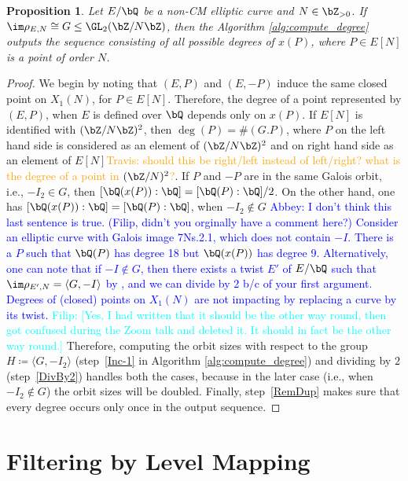 \documentclass[11pt,reqno]{amsart}
\theoremstyle{plain}
\newtheorem{proposition}[theorem]{Proposition}
\theoremstyle{definition}
\newcommand{\Q}{\bQ}
\newcommand{\Z}{\bZ}
\newcommand{\filip}[1]{{\textcolor{cyan}{Filip: [#1]}}}
\newcommand{\abbey}[1]{\textcolor{blue}{Abbey: #1}}
\newcommand{\travis}[1]{\textcolor{orange}{Travis: #1}}
\newcommand{\abedit}[1]{{\color{blue} #1}}
\begin{document}
\begin{proposition}
Let $E/\Q$ be a non-CM elliptic curve and $N \in \Z_{>0}$. If $\im \rho_{E,N} \cong G \leq \GL_2(\Z/N\Z)$, then the Algorithm \ref{alg:compute_degree} outputs the sequence consisting of all possible degrees of $x(P)$, where $P\in E[N]$ is a point of order $N$.
\end{proposition}
\begin{proof}
    We begin by noting that $(E, P)$ and $(E, -P)$ \abedit{induce the same closed} point on $X_1(N)$, for $P \in E[N]$. Therefore, the degree of
    a point represented by $(E, P)$, when
    $E$ is defined over $\Q$ depends only on $x(P)$.
    If $E[N]$ is identified with $(\Z/N\Z)^2$, then $\deg(P)=\# (G. P)$, where $P$ on the left hand side is considered as an element of $(\Z/N\Z)^2$
    and on right hand side as an element of $E[N]$\travis{should this be right/left instead of left/right? what is the degree of a point in $(\Z/N)^2$?}.
    If $P$ and $-P$ are in the same Galois orbit, i.e., $-I_2\in G$, then $[\Q(x(P)):\Q]=[\Q(P):\Q]/2$. On the other hand, one has $[\Q(x(P)):\Q]=[\Q(P):\Q]$, when
    $-I_2\notin G$ \abbey{I don't think this last sentence is true. (Filip, didn't you orginally have a comment here?) Consider an elliptic curve with Galois image 7Ns.2.1, which does not contain $-I$. There is a $P$ such that $\Q(P)$ has degree 18 but $\Q(x(P))$ has degree 9. Alternatively, one can note that if $-I \notin G$, then there exists a twist $E'$ of $E/\Q$ such that $\im \rho_{E',N}=\langle G, -I \rangle$ by \cite[Corollary 5.25]{sutherland}, and we can divide by 2 b/c of your first argument. Degrees of (closed) points on $X_1(N)$ are not impacting by replacing a curve by its twist.} \filip{Yes, I had written that it should be the other way round, then got confused during the Zoom talk and deleted it. It should in fact be the other way round.}
    Therefore, computing the orbit sizes with respect to the
    group $H\coloneqq \langle G, -I_2 \rangle$ (step~\ref{Inc-1} in Algorithm \ref{alg:compute_degree}) and dividing
    by $2$ (step~\ref{DivBy2}) handles both the cases, because in the later case (i.e., when $-I_2\notin G$) the orbit sizes will be doubled.
    Finally, step~\ref{RemDup} makes sure that every degree occurs only once in the output sequence.
\end{proof}


\section{Filtering by Level Mapping}
\end{document}

